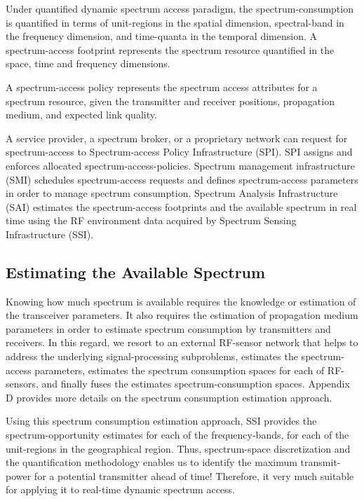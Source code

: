 \documentclass[journal,12pt,draftclsnofoot,onecolumn]{IEEEtran}
\begin{document}
Under quantified dynamic spectrum access paradigm, the spectrum-consumption is quantified in terms of unit-regions in the spatial dimension, spectral-band in the frequency dimension, and time-quanta in the temporal dimension. A spectrum-access footprint represents the spectrum resource quantified in the space, time and frequency dimensions. 

A spectrum-access policy represents the spectrum access attributes for a spectrum resource, given the transmitter and receiver positions, propagation medium, and expected link quality. 

A service provider, a spectrum broker, or a proprietary network can request for spectrum-access to Spectrum-access Policy Infrastructure (SPI). SPI assigns and enforces allocated spectrum-access-policies. Spectrum management infrastructure (SMI) schedules spectrum-access requests and defines spectrum-access parameters in order to manage spectrum consumption. Spectrum Analysis Infrastructure (SAI) estimates the spectrum-access footprints and the available spectrum in real time using the RF environment data acquired by Spectrum Sensing Infrastructure (SSI).

\subsection{Estimating the Available Spectrum}
Knowing how much spectrum is available requires the knowledge or estimation of the transceiver parameters. It also requires the estimation of propagation medium parameters in order to estimate spectrum consumption by transmitters and receivers. In this regard, we resort to an external RF-sensor network that helps to address the underlying signal-processing subproblems, estimates the spectrum-access parameters, estimates the spectrum consumption spaces for each of RF-sensors, and finally fuses the estimates spectrum-consumption spaces. Appendix D provides more details on the spectrum consumption estimation approach.

Using this spectrum consumption estimation approach, SSI provides the spectrum-opportunity estimates for each of the frequency-bands, for each of the unit-regions in the geographical region. Thus, spectrum-space discretization and the quantification methodology enables us to identify the maximum transmit-power for a potential transmitter ahead of time! Therefore, it very much suitable for applying it to real-time dynamic spectrum access.
\end{document}
